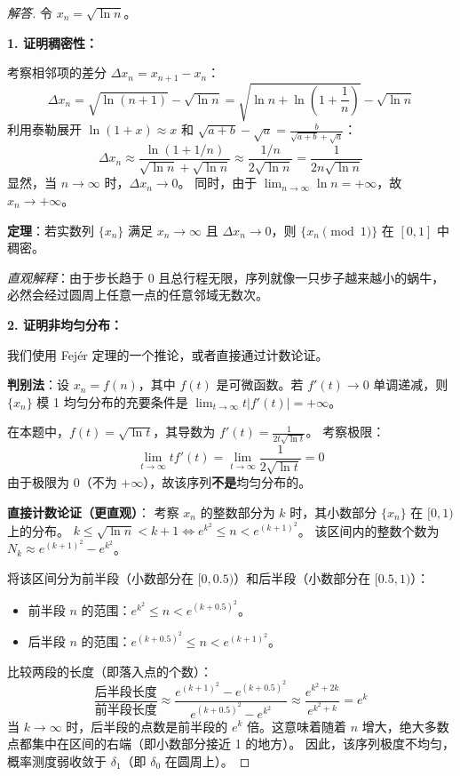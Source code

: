 \documentclass[a4paper,12pt]{article}
\newenvironment{solution}{\begin{proof}[解答]}{\end{proof}}
\begin{document}
\begin{solution}
    令 $x_n = \sqrt{\ln n}$。
    
    \textbf{1. 证明稠密性：}
    
    考察相邻项的差分 $\Delta x_n = x_{n+1} - x_n$：
    $$
    \Delta x_n = \sqrt{\ln(n+1)} - \sqrt{\ln n} = \sqrt{\ln n + \ln(1+\frac{1}{n})} - \sqrt{\ln n}
    $$
    利用泰勒展开 $\ln(1+x) \approx x$ 和 $\sqrt{a+b} - \sqrt{a} = \frac{b}{\sqrt{a+b}+\sqrt{a}}$：
    $$
    \Delta x_n \approx \frac{\ln(1+1/n)}{\sqrt{\ln n} + \sqrt{\ln n}} \approx \frac{1/n}{2\sqrt{\ln n}} = \frac{1}{2n\sqrt{\ln n}}
    $$
    显然，当 $n \to \infty$ 时，$\Delta x_n \to 0$。
    同时，由于 $\lim_{n\to\infty} \ln n = +\infty$，故 $x_n \to +\infty$。
    
    \textbf{定理}：若实数列 $\{x_n\}$ 满足 $x_n \to \infty$ 且 $\Delta x_n \to 0$，则 $\{x_n \pmod 1\}$ 在 $[0, 1]$ 中稠密。
    
    \textit{直观解释}：由于步长趋于 0 且总行程无限，序列就像一只步子越来越小的蜗牛，必然会经过圆周上任意一点的任意邻域无数次。
    
    \textbf{2. 证明非均匀分布：}
    
    我们使用 Fejér 定理的一个推论，或者直接通过计数论证。
    
    \textbf{判别法}：设 $x_n = f(n)$，其中 $f(t)$ 是可微函数。若 $f'(t) \to 0$ 单调递减，则 $\{x_n\}$ 模 1 均匀分布的充要条件是 $\lim_{t\to\infty} t |f'(t)| = +\infty$。
    
    在本题中，$f(t) = \sqrt{\ln t}$，其导数为 $f'(t) = \frac{1}{2t\sqrt{\ln t}}$。
    考察极限：
    $$ \lim_{t\to\infty} t f'(t) = \lim_{t\to\infty} \frac{1}{2\sqrt{\ln t}} = 0 $$
    由于极限为 0（不为 $+\infty$），故该序列\textbf{不是}均匀分布的。
    
    \textbf{直接计数论证（更直观）}：
    考察 $x_n$ 的整数部分为 $k$ 时，其小数部分 $\{x_n\}$ 在 $[0, 1)$ 上的分布。
    $k \le \sqrt{\ln n} < k+1 \iff e^{k^2} \le n < e^{(k+1)^2}$。
    该区间内的整数个数为 $N_k \approx e^{(k+1)^2} - e^{k^2}$。
    
    将该区间分为前半段（小数部分在 $[0, 0.5)$）和后半段（小数部分在 $[0.5, 1)$）：
    \begin{itemize}
        \item 前半段 $n$ 的范围：$e^{k^2} \le n < e^{(k+0.5)^2}$。
        \item 后半段 $n$ 的范围：$e^{(k+0.5)^2} \le n < e^{(k+1)^2}$。
    \end{itemize}
    比较两段的长度（即落入点的个数）：
    $$ \frac{\text{后半段长度}}{\text{前半段长度}} \approx \frac{e^{(k+1)^2} - e^{(k+0.5)^2}}{e^{(k+0.5)^2} - e^{k^2}} \approx \frac{e^{k^2+2k}}{e^{k^2+k}} = e^k $$
    当 $k \to \infty$ 时，后半段的点数是前半段的 $e^k$ 倍。这意味着随着 $n$ 增大，绝大多数点都集中在区间的右端（即小数部分接近 1 的地方）。
    因此，该序列极度不均匀，概率测度弱收敛于 $\delta_1$（即 $\delta_0$ 在圆周上）。
\end{solution}
\end{document}
